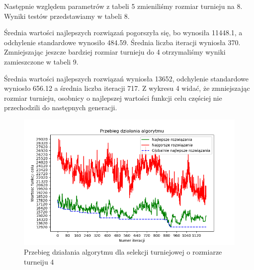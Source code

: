 \documentclass[12pt]{article}
\begin{document}
\par
Następnie względem parametrów z tabeli 5 zmieniliśmy rozmiar turnieju na 8. Wyniki testów przedstawiamy w tabeli 8.
\begin{table}[H]
\caption{Wyniki testów dla selekcji turniejowej o rozmiarze turnieju 8}
\begin{center}
\end{center}
\end{table}
Średnia wartości najlepszych rozwiązań pogorszyła się, bo wynosiła 11448.1, a odchylenie standardowe wynosiło 484.59. Średnia liczba iteracji wyniosła 370. Zmniejszając jeszcze bardziej rozmiar turnieju do 4 otrzymaliśmy wyniki zamieszczone w tabeli 9.
\begin{table}[H]
\caption{Wyniki testów dla selekcji turniejowej o rozmiarze turnieju 4}
\begin{center}
\end{center}
\end{table}
Średnia wartości najlepszych rozwiązań wyniosła 13652, odchylenie standardowe wyniosło 656.12 a średnia liczba iteracji 717.  Z wykresu 4 widać, że zmniejszając rozmiar turnieju, osobnicy o najlepszej wartości funkcji celu częściej nie przechodzili do następnych generacji.
\begin{figure}[H]
\caption{Przebieg działania algorytmu dla selekcji turniejowej o rozmiarze turneiju 4}
\includegraphics[scale=0.8]{tournament_size=4.png}
\end{figure}
\end{document}
